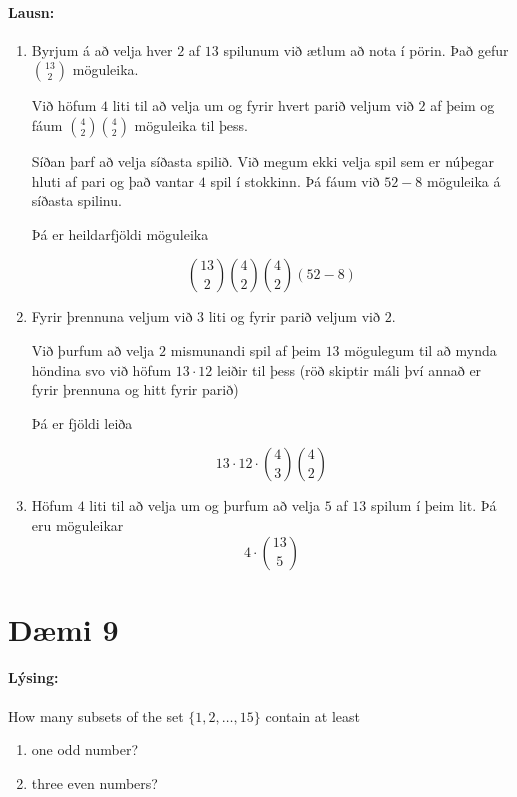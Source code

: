 \documentclass[a4paper,notitlepage]{article}
\theoremstyle{plain}
\theoremstyle{definition}
\begin{document}
\paragraph{Lausn:}
\begin{enumerate}
    \item Byrjum á að velja hver $2$ af $13$ spilunum við ætlum að nota í pörin. Það gefur $\binom{13}{2}$ möguleika.

        Við höfum $4$ liti til að velja um og fyrir hvert parið veljum við $2$ af þeim og fáum $\binom{4}{2}\binom{4}{2}$ möguleika til þess.

        Síðan þarf að velja síðasta spilið. Við megum ekki velja spil sem er núþegar hluti af pari og það vantar $4$ spil í stokkinn. Þá fáum við $52-8$ möguleika á síðasta spilinu.

        Þá er heildarfjöldi möguleika

        \begin{equation*}
            \binom{13}{2}\binom{4}{2}\binom{4}{2}(52-8)
        \end{equation*}

    \item Fyrir þrennuna veljum við $3$ liti og fyrir parið veljum við $2$.

        Við þurfum að velja $2$ mismunandi spil af þeim $13$ mögulegum til að mynda höndina svo við höfum $13\cdot 12$ leiðir til þess (röð skiptir máli því annað er fyrir þrennuna og hitt fyrir parið)

        Þá er fjöldi leiða

        \begin{equation*}
            13\cdot 12\cdot \binom{4}{3}\binom{4}{2}
        \end{equation*}

    \item Höfum $4$ liti til að velja um og þurfum að velja $5$ af $13$ spilum í þeim lit. Þá eru möguleikar
        \begin{equation*}
            4\cdot \binom{13}{5}
        \end{equation*}
\end{enumerate}

\newpage

\section*{Dæmi 9}
\paragraph{Lýsing:}
How many subsets of the set $\{1,2,\dots,15\}$ contain at least
\begin{enumerate}
    \item one odd number?
    \item three even numbers?
\end{enumerate}
\end{document}
